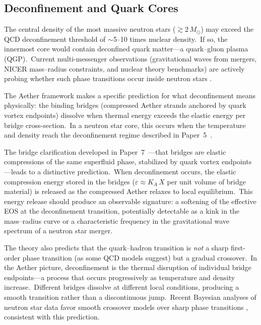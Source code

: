 ﻿\documentclass[12pt,letterpaper]{article}
\newcommand{\Ka}{K_{\!A}}
\begin{document}
\subsection{Deconfinement and Quark Cores}

The central density of the most massive neutron stars ($\gtrsim 2\,M_\odot$)
may exceed the QCD deconfinement threshold of $\sim$5--10 times nuclear density.\
If so, the innermost core would contain deconfined quark matter---a quark--gluon
plasma (QGP).\ Current multi-messenger observations (gravitational waves from
mergers, NICER mass--radius constraints, and nuclear theory benchmarks) are
actively probing whether such phase transitions occur inside neutron stars
\cite{li2025}.

The Aether framework makes a specific prediction for what deconfinement means
physically: the binding bridges (compressed Aether strands anchored by quark
vortex endpoints) dissolve when thermal energy exceeds the elastic energy
per bridge cross-section.\ In a neutron star core, this occurs when the
temperature and density reach the deconfinement regime described in
Paper~5~\cite{otto-strong}.

The bridge clarification developed in
Paper~7~\cite{otto-quantum}---that bridges are elastic compressions
of the same superfluid phase, stabilized by quark vortex endpoints---leads to
a distinctive prediction.\ When deconfinement occurs, the elastic compression
energy stored in the bridges ($\varepsilon \approx \Ka\, X$ per unit volume of
bridge material) is released as the compressed Aether relaxes to local
equilibrium.\ This energy release should produce an observable signature:
a softening of the effective EOS at the deconfinement transition, potentially
detectable as a kink in the mass--radius curve or a characteristic frequency
in the gravitational wave spectrum of a neutron star merger.

The theory also predicts that the quark--hadron transition is \emph{not} a
sharp first-order phase transition (as some QCD models suggest) but a gradual
crossover.\ In the Aether picture, deconfinement is the thermal disruption
of individual bridge endpoints---a process that occurs progressively as
temperature and density increase.\ Different bridges dissolve at different
local conditions, producing a smooth transition rather than a discontinuous
jump.\ Recent Bayesian analyses of neutron star data favor smooth crossover
models over sharp phase transitions \cite{li2025}, consistent with this
prediction.
\end{document}
